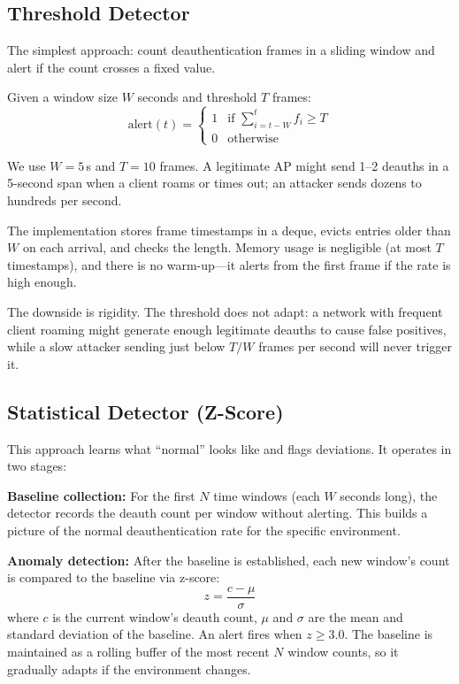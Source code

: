 \documentclass[conference]{IEEEtran}
\begin{document}
\subsection{Threshold Detector}

The simplest approach: count deauthentication frames in a sliding window and alert if the count crosses a fixed value.

Given a window size $W$ seconds and threshold $T$ frames:
\begin{equation}
\text{alert}(t) =
\begin{cases}
1 & \text{if } \sum_{i=t-W}^{t} f_i \geq T \\
0 & \text{otherwise}
\end{cases}
\end{equation}

We use $W = 5$\,s and $T = 10$ frames. A legitimate AP might send 1--2 deauths in a 5-second span when a client roams or times out; an attacker sends dozens to hundreds per second.

The implementation stores frame timestamps in a deque, evicts entries older than $W$ on each arrival, and checks the length. Memory usage is negligible (at most $T$ timestamps), and there is no warm-up---it alerts from the first frame if the rate is high enough.

The downside is rigidity. The threshold does not adapt: a network with frequent client roaming might generate enough legitimate deauths to cause false positives, while a slow attacker sending just below $T/W$ frames per second will never trigger it.

\subsection{Statistical Detector (Z-Score)}

This approach learns what ``normal'' looks like and flags deviations. It operates in two stages:

\textbf{Baseline collection:} For the first $N$ time windows (each $W$ seconds long), the detector records the deauth count per window without alerting. This builds a picture of the normal deauthentication rate for the specific environment.

\textbf{Anomaly detection:} After the baseline is established, each new window's count is compared to the baseline via z-score:
\begin{equation}
z = \frac{c - \mu}{\sigma}
\end{equation}
where $c$ is the current window's deauth count, $\mu$ and $\sigma$ are the mean and standard deviation of the baseline. An alert fires when $z \geq 3.0$. The baseline is maintained as a rolling buffer of the most recent $N$ window counts, so it gradually adapts if the environment changes.
\end{document}
